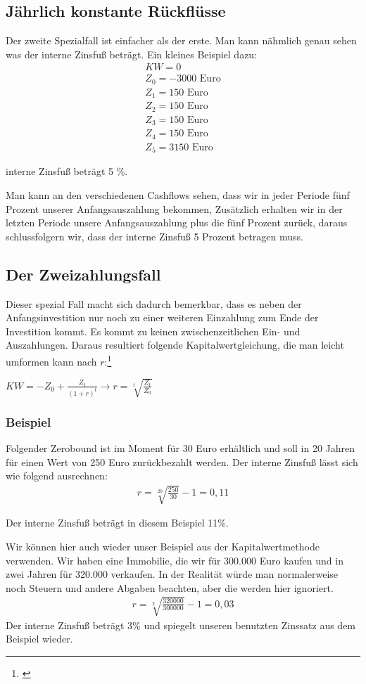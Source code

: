 \subsection{Jährlich konstante Rückflüsse}
Der zweite Spezialfall ist einfacher als der erste. Man kann nähmlich genau sehen was der interne Zinsfuß beträgt. Ein kleines Beispiel dazu:
\begin{align*}
    KW = 0                   \\
    Z_0 = -3000 \text{ Euro} \\
    Z_1 = 150 \text{ Euro}   \\
    Z_2 = 150 \text{ Euro}   \\
    Z_3 = 150 \text{ Euro}   \\
    Z_4 = 150 \text{ Euro}   \\
    Z_5 = 3150 \text{ Euro}
\end{align*}
\begin{center}
    interne Zinsfuß beträgt 5 \%.
\end{center}
Man kann an den verschiedenen Cashflows sehen, dass wir in jeder Periode fünf Prozent unserer Anfangsauszahlung bekommen, Zusätzlich erhalten wir in der letzten Periode unsere Anfangsauszahlung plus die fünf Prozent zurück, daraus schlussfolgern wir, dass der interne Zinsfuß 5 Prozent betragen muss.
\subsection{Der Zweizahlungsfall}
Dieser spezial Fall macht sich dadurch bemerkbar, dass es neben der Anfangsinvestition nur noch zu einer weiteren Einzahlung zum Ende der Investition kommt. Es kommt zu keinen zwischenzeitlichen Ein- und Auszahlungen. Daraus resultiert folgende Kapitalwertgleichung, die man leicht umformen kann nach $r$:\footnote{\cite{lex-interner-zinsfuss}}\\
\begin{center}
    $ KW = -Z_{0} + \frac{Z_{t}}{(1+r)^{t}} \rightarrow r = \sqrt[t]{\frac{Z_t}{Z_0}} $
\end{center}
\newpage
\subsubsection{Beispiel}
Folgender Zerobound ist im Moment für 30 Euro erhältlich und soll in 20 Jahren für einen Wert von 250 Euro zurückbezahlt werden. Der interne Zinsfuß lässt sich wie folgend ausrechnen:
\begin{align*}
    r = \sqrt[20]{\frac{250}{30}} -1 = 0,11
\end{align*}
\begin{center}
    Der interne Zinsfuß beträgt in diesem Beispiel 11\%.
\end{center}
Wir können hier auch wieder unser Beispiel aus der Kapitalwertmethode verwenden. Wir haben eine Immobilie, die wir für 300.000 Euro kaufen und in zwei Jahren für 320.000 verkaufen. In der Realität würde man normalerweise noch Steuern und andere Abgaben beachten, aber die werden hier ignoriert.
\begin{align*}
    r = \sqrt[2]{\frac{320000}{300000}} -1 = 0,03
\end{align*}
Der interne Zinsfuß beträgt 3\% und spiegelt unseren benutzten Zinssatz aus dem Beispiel wieder.
